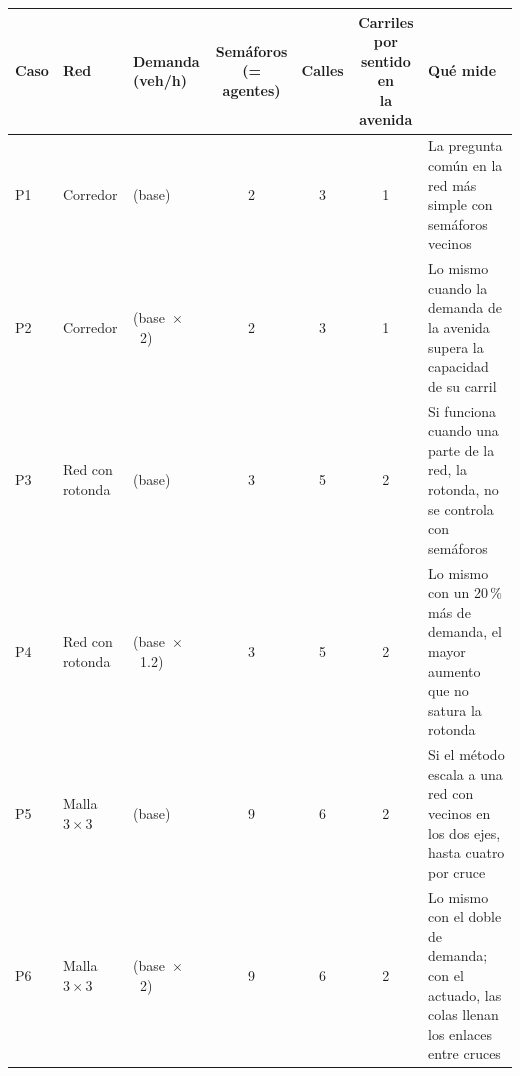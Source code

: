 \begin{tabular}{l>{\raggedright\arraybackslash}p{1.4cm}>{\raggedright\arraybackslash}p{2.75cm}ccc>{\raggedright\arraybackslash}p{3.9cm}}
\toprule
Caso & Red & Demanda (veh/h) & \makecell{Semáforos\\(= agentes)} & Calles & \makecell{Carriles por\\sentido en\\la avenida} & Qué mide \\
\midrule
P1 & Corredor & 1810 (base) & 2 & 3 & 1 & La pregunta común en la red más simple con semáforos vecinos \\
P2 & Corredor & 3620 (base~$\times$~2) & 2 & 3 & 1 & Lo mismo cuando la demanda de la avenida supera la capacidad de su carril \\
P3 & Red con rotonda & 2150 (base) & 3 & 5 & 2 & Si funciona cuando una parte de la red, la rotonda, no se controla con semáforos \\
P4 & Red con rotonda & 2580 (base~$\times$~1.2) & 3 & 5 & 2 & Lo mismo con un 20\,\% más de demanda, el mayor aumento que no satura la rotonda \\
P5 & Malla $3 \times 3$ & 4350 (base) & 9 & 6 & 2 & Si el método escala a una red con vecinos en los dos ejes, hasta cuatro por cruce \\
P6 & Malla $3 \times 3$ & 8700 (base~$\times$~2) & 9 & 6 & 2 & Lo mismo con el doble de demanda; con el actuado, las colas llenan los enlaces entre cruces \\
\bottomrule
\end{tabular}
